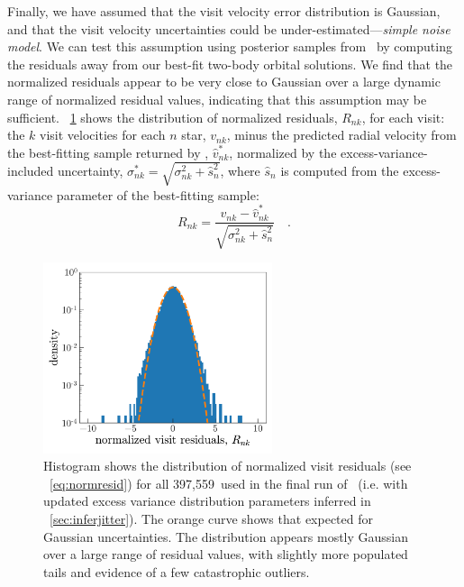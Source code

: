 \documentclass[modern, letterpaper]{aastex62}
\newcommand{\thejoker}{\project{The~Joker}}
\newcommand{\nvisits}{397,559}
\begin{document}
Finally, we have assumed that the visit velocity error distribution is Gaussian,
and that the visit velocity uncertainties could be
under-estimated---\emph{simple noise model}.
We can test this assumption using posterior samples from \thejoker\ by computing
the residuals away from our best-fit two-body orbital solutions.
We find that the normalized residuals appear to be very close to Gaussian over a
large dynamic range of normalized residual values, indicating that this
assumption may be sufficient.
\figurename~\ref{fig:residuals} shows the distribution of normalized residuals,
$R_{nk}$, for each visit: the $k$ visit velocities for each $n$ star, $v_{nk}$,
minus the predicted radial velocity from the best-fitting sample returned by
\thejoker, $\hat{v}^*_{nk}$, normalized by the excess-variance-included
uncertainty, $\sigma_{nk}^* = \sqrt{\sigma_{nk}^2 + \hat{s}_{n}^2}$, where
$\hat{s}_{n}$ is computed from the excess-variance parameter of the best-fitting
sample:
\begin{equation}
    R_{nk} = \frac{v_{nk} - \hat{v}^*_{nk}}{\sqrt{\sigma_{nk}^2 +
    \hat{s}_{n}^2}} \quad . \label{eq:normresid}
\end{equation}

\begin{figure}[h]
\begin{center}
\includegraphics[width=0.6\textwidth]{residuals}
\end{center}
\caption{%
Histogram shows the distribution of normalized visit residuals (see
\eqname~\ref{eq:normresid}) for all \nvisits\ used in the final run of
\thejoker\ (i.e. with updated excess variance distribution parameters inferred
in \sectionname~\ref{sec:inferjitter}).
The orange curve shows that expected for Gaussian uncertainties.
The distribution appears mostly Gaussian over a large range of residual values,
with slightly more populated tails and evidence of a few catastrophic outliers.
\label{fig:residuals}
}
\end{figure}
\end{document}
